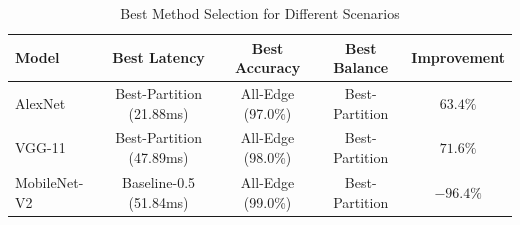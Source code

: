 \begin{table}[htbp]
\centering
\caption{Best Method Selection for Different Scenarios}
\label{tab:best_methods}
\begin{tabular}{lcccc}
\toprule
\textbf{Model} & \textbf{Best Latency} & \textbf{Best Accuracy} & \textbf{Best Balance} & \textbf{Improvement} \\
\midrule
AlexNet & Best-Partition (21.88ms) & All-Edge (97.0\%) & Best-Partition & $63.4\%$ \\
VGG-11 & Best-Partition (47.89ms) & All-Edge (98.0\%) & Best-Partition & $71.6\%$ \\
MobileNet-V2 & Baseline-0.5 (51.84ms) & All-Edge (99.0\%) & Best-Partition & $-96.4\%$ \\
\bottomrule
\end{tabular}
\end{table}